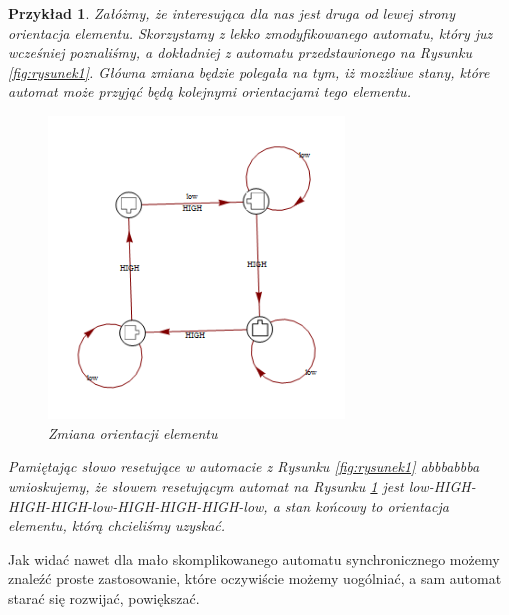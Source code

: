 \documentclass[12pt,a4paper]{article}
\newtheorem{pr}{Przyk{\l}ad}[section]
\begin{document}
\begin{pr}
Za{\l}\'{o}\.{z}my, \.{z}e interesuj\k{a}ca dla nas jest druga od lewej strony orientacja elementu. Skorzystamy z lekko zmodyfikowanego automatu, kt\'{o}ry juz wcze\'{s}niej poznali\'{s}my, a dok{\l}adniej z automatu przedstawionego na Rysunku \ref{fig:rysunek1}. G{\l}\'{o}wna zmiana b\k{e}dzie polega{\l}a na tym, i\.{z} moz\.{z}liwe stany, kt\'{o}re automat mo\.{z}e przyj\k{a}\'{c} b\k{e}d\k{a} kolejnymi orientacjami tego elementu.
\\
\begin{figure}[H]
    \centering
    \includegraphics[width=0.7\textwidth]{rysunek5}
    \caption{Zmiana orientacji elementu}
    \label{fig:rysunek5}
\end{figure}

Pami\k{e}taj\k{a}c s{\l}owo resetuj\k{a}ce w automacie z Rysunku \ref{fig:rysunek1} abbbabbba wnioskujemy, \.{z}e s{\l}owem resetuj\k{a}cym automat na Rysunku \ref{fig:rysunek5} jest low-HIGH-HIGH-HIGH-low-HIGH-HIGH-HIGH-low, a stan ko\'{n}cowy to orientacja elementu, kt\'{o}r\k{a} chcieli\'{s}my uzyska\'{c}.
\end{pr}

Jak wida\'{c} nawet dla ma{\l}o skomplikowanego automatu synchronicznego mo\.{z}emy znale\'{z}\'{c} proste zastosowanie, kt\'{o}re oczywi\'{s}cie mo\.{z}emy uog\'{o}lnia\'{c}, a sam automat stara\'{c} si\k{e} rozwija\'{c}, powi\k{e}ksza\'{c}.
\end{document}
